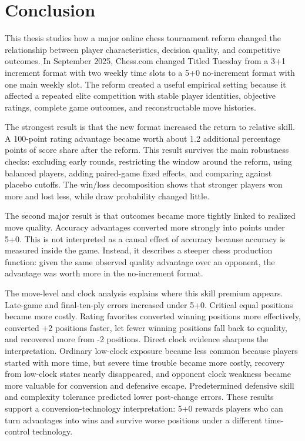 \section{Conclusion}

This thesis studies how a major online chess tournament reform changed the relationship between player characteristics, decision quality, and competitive outcomes. In September 2025, Chess.com changed Titled Tuesday from a 3+1 increment format with two weekly time slots to a 5+0 no-increment format with one main weekly slot. The reform created a useful empirical setting because it affected a repeated elite competition with stable player identities, objective ratings, complete game outcomes, and reconstructable move histories.

The strongest result is that the new format increased the return to relative skill. A 100-point rating advantage became worth about 1.2 additional percentage points of score share after the reform. This result survives the main robustness checks: excluding early rounds, restricting the window around the reform, using balanced players, adding paired-game fixed effects, and comparing against placebo cutoffs. The win/loss decomposition shows that stronger players won more and lost less, while draw probability changed little.

The second major result is that outcomes became more tightly linked to realized move quality. Accuracy advantages converted more strongly into points under 5+0. This is not interpreted as a causal effect of accuracy because accuracy is measured inside the game. Instead, it describes a steeper chess production function: given the same observed quality advantage over an opponent, the advantage was worth more in the no-increment format.

The move-level and clock analysis explains where this skill premium appears. Late-game and final-ten-ply errors increased under 5+0. Critical equal positions became more costly. Rating favorites converted winning positions more effectively, converted +2 positions faster, let fewer winning positions fall back to equality, and recovered more from -2 positions. Direct clock evidence sharpens the interpretation. Ordinary low-clock exposure became less common because players started with more time, but severe time trouble became more costly, recovery from low-clock states nearly disappeared, and opponent clock weakness became more valuable for conversion and defensive escape. Predetermined defensive skill and complexity tolerance predicted lower post-change errors. These results support a conversion-technology interpretation: 5+0 rewards players who can turn advantages into wins and survive worse positions under a different time-control technology.

